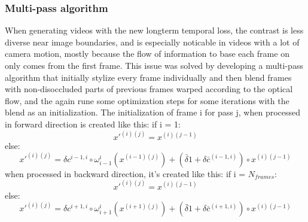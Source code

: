 \subsubsection{Multi-pass algorithm}
When generating videos with the new longterm temporal loss, the contrast is less diverse near image boundaries, and is especially noticable in videos with a lot of camera motion, mostly because the flow of information to base each frame on only comes from the first frame. This issue was solved by developing a multi-pass algorithm that initially stylize every frame individually and then blend frames with non-disoccluded parts of previous frames warped according to the optical flow, and the again rune some optimization steps for some iterations with the blend as an initialization.\newline
The initialization of frame i for pass j, when processed in forward direction is created like this:\newline
if i = 1: 
\begin{equation}
x'^{(i)(j)} = x^{(i)(j-1)}
\end{equation}
else:
\begin{equation}
x'^{(i)(j)} = \delta c^{i-1, i} \circ \omega_{i-1}^i(x^{(i-1)(j)}) + (\bar{\delta}1 + \delta \bar{c}^{(i-1, i)})\circ x^{(i)(j-1)}
\end{equation}\newline
when processed in backward direction, it's created like this:\newline
if i = $N_{frames}$:\newline
\begin{equation}
x'^{(i)(j)} = x^{(i)(j-1)}
\end{equation}
else:\newline
\begin{equation}
x'^{(i)(j)} = \delta c^{i+1, i} \circ \omega_{i+1}^i(x^{(i+1)(j)}) + (\bar{\delta}1 + \delta \bar{c}^{(i+1, i)})\circ x^{(i)(j-1)}
\end{equation}
\newpage
